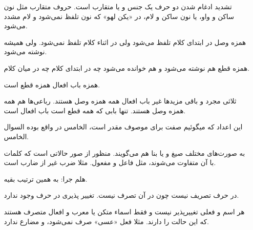 \documentclass{article}
\begin{document}
\begin{addpage}{3}
    \vspace*{6cm}
    \begin{note}
      تشدید ادغام شدن دو حرف یک جنس و یا متقارب است. حروف متقارب مثل نون ساکن و واو، یا نون ساکن و لام، در «یکن لهو» که نون تلفظ نمی‌شود و لام مشدد می‌شود.
    \end{note}
    \begin{note}
      همزه وصل در ابتدای کلام تلفظ می‌شود ولی در اثناء کلام تلفظ نمی‌شود. ولی همیشه نوشته می‌شود.
    \end{note}
    \begin{note}
      همزه قطع هم نوشته می‌شود و هم خوانده می‌شود چه در ابتدای کلام چه در میان کلام.
    \end{note}
    \begin{note}
      همزه باب افعال همزه قطع است.
    \end{note}
    \begin{note}
      ثلاثی مجرد و باقی مزیدها غیر باب افعال همه همزه وصل هستند. رباعی‌ها هم همه همزه وصل هستند. تنها بابی که همه قطع است باب افعال است.
    \end{note}

\end{addpage}

\begin{addpage}{4}
  \vspace*{10cm}
\begin{note}
  این اعداد که میگوئیم صفت برای موصوف مقدر است، الخامس در واقع بوده السوال الخامس.
\end{note}
\begin{note}
  به صورت‌های مختلف صیغ و یا بنا هم می‌گویند. منظور از صور حالاتی است که کلمات با آن متفاوت می‌شوند، مثل فاعل و مفعول. مثلا ضرب غیر از ضارب است.

هلم جرا: به همین ترتیب بقیه.
\end{note}
\vspace*{6cm}
\begin{note}
 در حرف تصریف نیست چون در آن تصرف نیست. تغییر پذیری در حرف وجود ندارد.
\end{note}
\vspace*{3.5cm}
\begin{note}
  هر اسم و فعلی تغییرپذیر نیست و فقط اسماء متکن یا معرب و افعال متصرف هستند که این حالت را دارند. مثلا فعل «عسی» صرف نمی‌شود، و مضارع ندارد.
\end{note}
\end{addpage}
\end{document}
